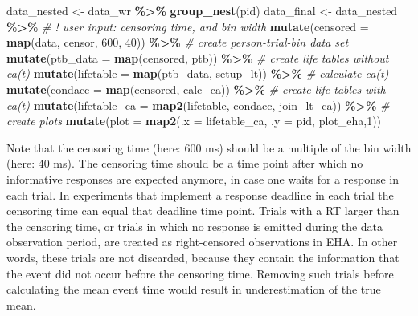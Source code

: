 \documentclass[
  man, donotrepeattitle,floatsintext]{apa6}
\newenvironment{Shaded}{\begin{snugshade}}{\end{snugshade}}
\newcommand{\AttributeTok}[1]{\textcolor[rgb]{0.13,0.29,0.53}{#1}}
\newcommand{\CommentTok}[1]{\textcolor[rgb]{0.56,0.35,0.01}{\textit{#1}}}
\newcommand{\DecValTok}[1]{\textcolor[rgb]{0.00,0.00,0.81}{#1}}
\newcommand{\FunctionTok}[1]{\textcolor[rgb]{0.13,0.29,0.53}{\textbf{#1}}}
\newcommand{\NormalTok}[1]{#1}
\newcommand{\OtherTok}[1]{\textcolor[rgb]{0.56,0.35,0.01}{#1}}
\newcommand{\SpecialCharTok}[1]{\textcolor[rgb]{0.81,0.36,0.00}{\textbf{#1}}}
\begin{document}
\begin{Shaded}
\begin{Highlighting}[]
\NormalTok{data\_nested }\OtherTok{\textless{}{-}}\NormalTok{ data\_wr }\SpecialCharTok{\%\textgreater{}\%} \FunctionTok{group\_nest}\NormalTok{(pid)}
\NormalTok{data\_final }\OtherTok{\textless{}{-}}\NormalTok{ data\_nested }\SpecialCharTok{\%\textgreater{}\%} 
  \CommentTok{\# ! user input: censoring time, and bin width}
  \FunctionTok{mutate}\NormalTok{(}\AttributeTok{censored =} \FunctionTok{map}\NormalTok{(data, censor, }\DecValTok{600}\NormalTok{, }\DecValTok{40}\NormalTok{)) }\SpecialCharTok{\%\textgreater{}\%}   
  \CommentTok{\# create person{-}trial{-}bin data set}
  \FunctionTok{mutate}\NormalTok{(}\AttributeTok{ptb\_data =} \FunctionTok{map}\NormalTok{(censored, ptb)) }\SpecialCharTok{\%\textgreater{}\%}          
  \CommentTok{\# create life tables without ca(t)}
  \FunctionTok{mutate}\NormalTok{(}\AttributeTok{lifetable =} \FunctionTok{map}\NormalTok{(ptb\_data, setup\_lt)) }\SpecialCharTok{\%\textgreater{}\%}   
  \CommentTok{\# calculate ca(t)}
  \FunctionTok{mutate}\NormalTok{(}\AttributeTok{condacc =} \FunctionTok{map}\NormalTok{(censored, calc\_ca)) }\SpecialCharTok{\%\textgreater{}\%}      
  \CommentTok{\# create life tables with ca(t)}
  \FunctionTok{mutate}\NormalTok{(}\AttributeTok{lifetable\_ca =} \FunctionTok{map2}\NormalTok{(lifetable, condacc, join\_lt\_ca)) }\SpecialCharTok{\%\textgreater{}\%}    
  \CommentTok{\# create plots }
  \FunctionTok{mutate}\NormalTok{(}\AttributeTok{plot =} \FunctionTok{map2}\NormalTok{(}\AttributeTok{.x =}\NormalTok{ lifetable\_ca, }\AttributeTok{.y =}\NormalTok{ pid, plot\_eha,}\DecValTok{1}\NormalTok{))  }
\end{Highlighting}
\end{Shaded}

\normalsize

Note that the censoring time (here: 600 ms) should be a multiple of the bin width (here: 40 ms). The censoring time should be a time point after which no informative responses are expected anymore, in case one waits for a response in each trial. In experiments that implement a response deadline in each trial the censoring time can equal that deadline time point. Trials with a RT larger than the censoring time, or trials in which no response is emitted during the data observation period, are treated as right-censored observations in EHA. In other words, these trials are not discarded, because they contain the information that the event did not occur before the censoring time. Removing such trials before calculating the mean event time would result in underestimation of the true mean.
\end{document}
